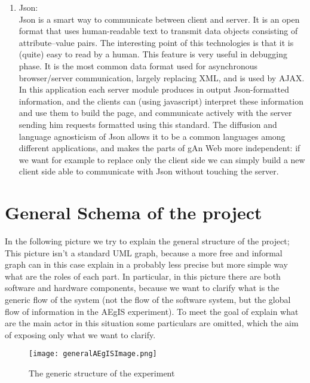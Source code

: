 \begin{enumerate}
\item
Json:
\\
\noindent
Json is a smart way to communicate between client and server.
It is an open format that uses human-readable text to transmit data objects consisting of attribute–value pairs. The interesting point of this technologies is that it is (quite) easy to read by a human. This feature is very useful in debugging phase.  
It is the most common data format used for asynchronous browser/server communication, largely replacing XML, and is used by AJAX. In this application each server module produces in output Json-formatted information, and the clients can (using javascript) interpret these information and use them to build the page, and communicate actively with the server sending him requests formatted using this standard.
The diffusion and language agnosticism of Json allows it to be a common languages among different applications, and makes the parts of gAn Web more independent: if we want for example to replace only the client side we can simply build a new client side able to communicate with Json without touching the server. 

\end{enumerate}  


\section{General Schema of the project}

In the following picture we try to explain the general structure of the project; This picture isn't a standard UML graph, because a more free and informal graph can in this case explain in a probably less precise but more simple way what are the roles of each part. In particular, in this picture there are both software and hardware components, because we want to clarify what is the generic flow of the system (not the flow of the software system, but the global flow of information in the AEgIS experiment). To meet the goal of explain what are the main actor in this situation some particulars are omitted, which the aim of exposing only what we want to clarify.

\begin{figure}[H]
\centering
\texttt{[image: generalAEgISImage.png]} 
\caption{The generic structure of the experiment}
\end{figure}
   
